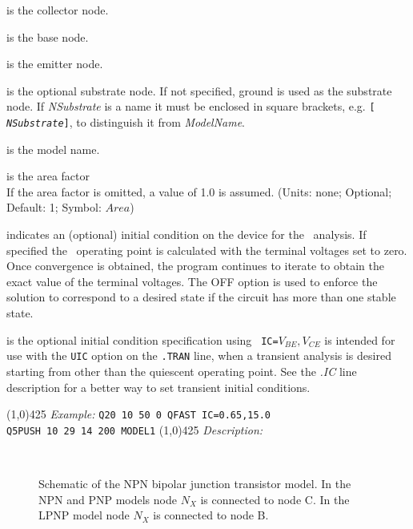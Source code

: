 \begin{widelist}
\item[{\it NCollector}] is the collector node.
\item[{\it NBase}] is the base node.
\item[{\it NEmitter}] is the emitter node.
\item[{\it NSubstrate}] is the optional substrate node.
If not specified, ground is used as the substrate node. If {\it
NSubstrate} is a name  it
must be enclosed in square brackets, e.g. {\tt [{\it
NSubstrate}]}, to distinguish it from {\it ModelName}.
\item[{\it ModelName}] is  the  model  name.
\item[{\it Area}]  is  the  area  factor\\
If the area  factor  is  omitted,  a  value of 1.0 is assumed.
(Units: none; Optional; Default: 1; Symbol: $Area$)
\item[{\tt OFF}] indicates an (optional)
initial condition on the device for the \dc\ analysis. If
specified the \dc\ operating point is calculated with the terminal
voltages set to zero.  Once convergence is obtained, the program
continues to iterate to obtain the exact  value of the  terminal
voltages.  The OFF option is used to enforce the solution to
correspond  to  a  desired  state if the circuit has more than one
stable state.
\item[{\tt IC}] is the
optional initial condition specification using  {\tt
IC=}$V_{BE},V_{CE}$ is  intended  for use with the {\tt UIC}
option on the {\tt .TRAN} line, when a transient analysis is
desired  starting  from  other than  the  quiescent  operating
point.   See  the  {\it .IC} line
description for a better way to set transient initial conditions.
\end{widelist}
\linethickness{0.5mm} \line(1,0){425}
\newline
\textit{Example:}
\newline
\texttt{Q20 10 50 0 QFAST IC=0.65,15.0 \\
Q5PUSH 10 29 14 200 MODEL1}
\newline
\linethickness{0.5mm} \line(1,0){425}
\newline
\textit{Description:}\\
  
\begin{figure}[h]
\centering \  \caption[Schematic of bipolar junction
transistor model]{Schematic of the NPN bipolar junction transistor
model. In the NPN and PNP models node $N_X$ is connected to node
C. In the LPNP model node $N_X$ is connected to node B.
\label{bjt:model}}
\end{figure}

